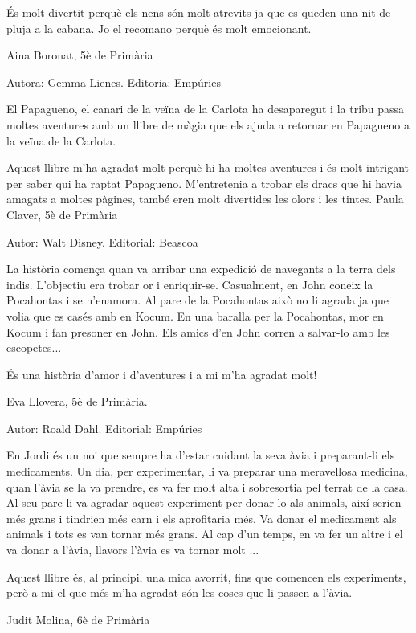 \begin{shortnews}
{És molt divertit perquè els nens són molt atrevits ja que es queden una nit de pluja a la cabana. Jo el recomano perquè és molt emocionant.

Aina Boronat, 5è de Primària
}

{
Autora: Gemma Lienes.    Editoria: Empúries

El Papagueno, el canari de la veïna de la Carlota ha desaparegut i la tribu passa moltes aventures amb un llibre de màgia que els ajuda a retornar en Papagueno a la veïna de la Carlota.  

Aquest  llibre m’ha agradat molt perquè hi ha moltes aventures i és molt intrigant per saber qui ha raptat Papagueno. M’entretenia a trobar els dracs que hi havia amagats a moltes pàgines, també eren molt divertides les olors i les tintes.  
Paula Claver, 5è de Primària
}

{
Autor: Walt Disney.   Editorial: Beascoa

La història comença quan va arribar una expedició de navegants a la terra dels indis.
L’objectiu era trobar or i enriquir-se. Casualment, en John coneix la Pocahontas i se n’enamora. Al pare de la Pocahontas  això no li agrada ja que volia que es casés amb en Kocum. En una baralla per la Pocahontas, mor en Kocum i fan presoner en John. Els amics d’en John corren a salvar-lo amb les escopetes...

És una història d’amor i d’aventures i a mi m’ha agradat molt!

Eva Llovera, 5è de Primària.
}


{
Autor: Roald Dahl.   Editorial: Empúries

En Jordi és un noi que  sempre ha d’estar cuidant la seva àvia i preparant-li els medicaments. Un dia, per experimentar,  li va preparar  una meravellosa medicina, quan l’àvia se la va prendre, es va fer molt alta i sobresortia pel terrat de la casa. Al seu pare li va agradar aquest experiment per donar-lo als animals, així serien més grans i tindrien més carn i els aprofitaria més. Va donar el medicament als animals i tots es van tornar  més grans. Al cap d’un temps, en va fer un altre i el va donar a l’àvia, llavors l’àvia es va tornar molt ...  

Aquest llibre és, al principi, una mica avorrit, fins que  comencen els experiments, però a mi el que més m’ha agradat són les coses que li passen a l’àvia.

Judit Molina, 6è de Primària
}


\end{shortnews}
